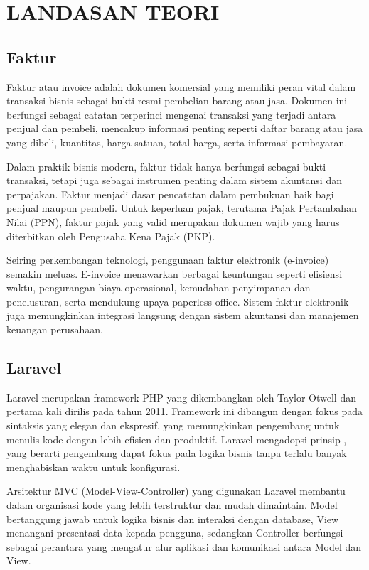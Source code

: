 \documentclass[a4paper,12pt]{report}
\begin{document}
\chapter{LANDASAN TEORI}

\section{Faktur}
Faktur atau invoice adalah dokumen komersial yang memiliki peran vital dalam transaksi bisnis sebagai bukti resmi pembelian barang atau jasa. Dokumen ini berfungsi sebagai catatan terperinci mengenai transaksi yang terjadi antara penjual dan pembeli, mencakup informasi penting seperti daftar barang atau jasa yang dibeli, kuantitas, harga satuan, total harga, serta informasi pembayaran.

Dalam praktik bisnis modern, faktur tidak hanya berfungsi sebagai bukti transaksi, tetapi juga sebagai instrumen penting dalam sistem akuntansi dan perpajakan. Faktur menjadi dasar pencatatan dalam pembukuan baik bagi penjual maupun pembeli. Untuk keperluan pajak, terutama Pajak Pertambahan Nilai (PPN), faktur pajak yang valid merupakan dokumen wajib yang harus diterbitkan oleh Pengusaha Kena Pajak (PKP).

Seiring perkembangan teknologi, penggunaan faktur elektronik (e-invoice) semakin meluas. E-invoice menawarkan berbagai keuntungan seperti efisiensi waktu, pengurangan biaya operasional, kemudahan penyimpanan dan penelusuran, serta mendukung upaya paperless office. Sistem faktur elektronik juga memungkinkan integrasi langsung dengan sistem akuntansi dan manajemen keuangan perusahaan.

\section{Laravel}
Laravel merupakan framework PHP yang dikembangkan oleh Taylor Otwell dan pertama kali dirilis pada tahun 2011. Framework ini dibangun dengan fokus pada sintaksis yang elegan dan ekspresif, yang memungkinkan pengembang untuk menulis kode dengan lebih efisien dan produktif. Laravel mengadopsi prinsip , yang berarti pengembang dapat fokus pada logika bisnis tanpa terlalu banyak menghabiskan waktu untuk konfigurasi.

Arsitektur MVC (Model-View-Controller) yang digunakan Laravel membantu dalam organisasi kode yang lebih terstruktur dan mudah dimaintain. Model bertanggung jawab untuk logika bisnis dan interaksi dengan database, View menangani presentasi data kepada pengguna, sedangkan Controller berfungsi sebagai perantara yang mengatur alur aplikasi dan komunikasi antara Model dan View.
\end{document}
